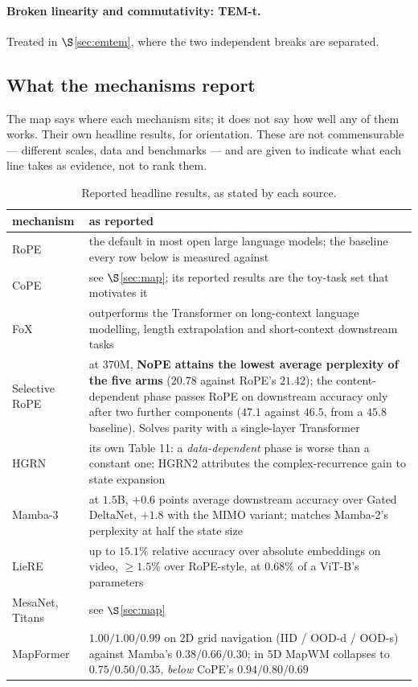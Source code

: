 \documentclass[11pt]{article}
\begin{document}
\paragraph{Broken linearity and commutativity: TEM-t.} Treated in
$\S$\ref{sec:emtem}, where the two independent breaks are separated.


\subsection{What the mechanisms report}

The map says where each mechanism sits; it does not say how well any of them works.
Their own headline results, for orientation. These are not commensurable --- different
scales, data and benchmarks --- and are given to indicate what each line takes as
evidence, not to rank them.

\begin{table}[htbp]\centering\small
\caption{Reported headline results, as stated by each source.}
\label{tab:reported}
\begin{tabular}{@{}p{3.1cm}p{11.2cm}@{}}
\toprule
mechanism & as reported \\
\midrule
RoPE & the default in most open large language models; the baseline every row below is measured against \\[2pt]
CoPE & see $\S$\ref{sec:map}; its reported results are the toy-task set that motivates it \\[2pt]
FoX & outperforms the Transformer on long-context language modelling, length extrapolation and short-context downstream tasks \\[2pt]
Selective RoPE & at $370$M, \textbf{NoPE attains the lowest average perplexity of the five arms} ($20.78$ against RoPE's $21.42$); the content-dependent phase passes RoPE on downstream accuracy only after two further components ($47.1$ against $46.5$, from a $45.8$ baseline). Solves parity with a single-layer Transformer \\[2pt]
HGRN & its own Table 11: a \emph{data-dependent} phase is worse than a constant one; HGRN2 attributes the complex-recurrence gain to state expansion \\[2pt]
Mamba-3 & at $1.5$B, $+0.6$ points average downstream accuracy over Gated DeltaNet, $+1.8$ with the MIMO variant; matches Mamba-2's perplexity at half the state size \\[2pt]
LieRE & up to $15.1\%$ relative accuracy over absolute embeddings on video, $\ge 1.5\%$ over RoPE-style, at $0.68\%$ of a ViT-B's parameters \\[2pt]
MesaNet, Titans & see $\S$\ref{sec:map} \\[2pt]
MapFormer & $1.00/1.00/0.99$ on $2$D grid navigation (IID / OOD-d / OOD-s) against Mamba's $0.38/0.66/0.30$; in $5$D MapWM collapses to $0.75/0.50/0.35$, \emph{below} CoPE's $0.94/0.80/0.69$ \\
\bottomrule
\end{tabular}
\end{table}
\end{document}
